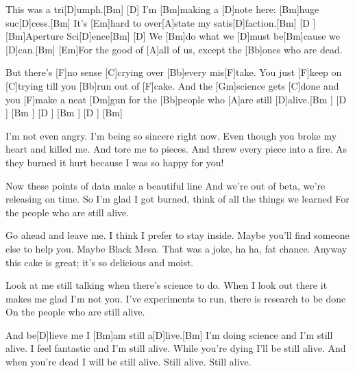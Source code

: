 

\begin{guitar}
	This was a tri[D]umph.[Bm]{}
	[D] I'm [Bm]making a [D]note here: [Bm]huge suc[D]cess.[Bm]{}
	It's [Em]hard to over[A]state my satis[D]faction.[Bm]{}
	[D ] [Bm]Aperture Sci[D]ence[Bm]{}
	[D] We [Bm]do what we [D]must be[Bm]cause we [D]can.[Bm]{}
	[Em]For the good of [A]all of us, except the [Bb]ones who are dead.
	
	But there's [F]no sense [C]crying over [Bb]every mis[F]take.
	You just [F]keep on [C]trying till you [Bb]run out of [F]cake.
	And the [Gm]science gets [C]done and you [F]make a neat [Dm]gun
	for the [Bb]people who [A]are still [D]alive.[Bm ] [D ] [Bm ] [D ] [Bm ] [D ] [Bm]{}
	
	I'm not even angry.
	I'm being so sincere right now.
	Even though you broke my heart and killed me.
	And tore me to pieces.
	And threw every piece into a fire.
	As they burned it hurt because I was so happy for you!
	
	Now these points of data make a beautiful line
	And we're out of beta, we're releasing on time.
	So I'm glad I got burned, think of all the things we learned
	For the people who are still alive.
	
	Go ahead and leave me.
	I think I prefer to stay inside.
	Maybe you'll find someone else to help you.
	Maybe Black Mesa.
	That was a joke, ha ha, fat chance.
	Anyway this cake is great; it's so delicious and moist.
	
	Look at me still talking when there's science to do.
	When I look out there it makes me glad I'm not you.
	I've experiments to run, there is research to be done
	On the people who are still alive.
	
	And be[D]lieve me I [Bm]am still a[D]live.[Bm]{}	
	I'm doing science and I'm still alive.
	I feel fantastic and I'm still alive.
	While you're dying I'll be still alive.
	And when you're dead I will be still alive.
	Still alive. Still alive.
	
\end{guitar}